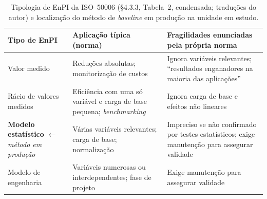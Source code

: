 \begin{table}[htbp]
  \centering\small
  \caption[Tipologia de EnPI da ISO 50006 e localização do método em produção]{Tipologia de EnPI da ISO~50006 (\S4.3.3, Tabela~2, condensada; traduções do autor) e localização do método de \emph{baseline} em produção na unidade em estudo.}
  \label{tab:tipologia-enpi}
  \begin{tabularx}{\textwidth}{@{}l X X@{}}
    \toprule
    \textbf{Tipo de EnPI} & \textbf{Aplicação típica (norma)} & \textbf{Fragilidades enunciadas pela própria norma} \\
    \midrule
    Valor medido & Reduções absolutas; monitorização de custos & Ignora variáveis relevantes; \enquote{resultados enganadores na maioria das aplicações} \\
    Rácio de valores medidos & Eficiência com uma só variável e carga de base pequena; \emph{benchmarking} & Ignora carga de base e efeitos não lineares \\
    \textbf{Modelo estatístico} $\leftarrow$ \emph{método em produção} & Várias variáveis relevantes; carga de base; normalização & Impreciso se não confirmado por testes estatísticos; exige manutenção para assegurar validade \\
    Modelo de engenharia & Variáveis numerosas ou interdependentes; fase de projeto & Exige manutenção para assegurar validade \\
    \bottomrule
  \end{tabularx}
\end{table}

